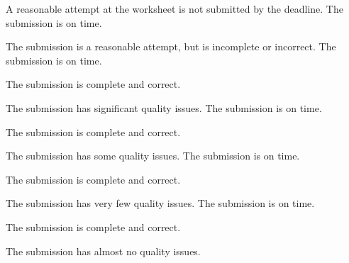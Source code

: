 \documentclass{../fal_assignment}
\begin{document}
\begin{markingrubric}
%
        \grade\fail	A reasonable attempt at the worksheet is not submitted by the deadline.
        \grade 		The submission is on time.
        \par		The submission is a reasonable attempt, but is incomplete or incorrect.
        \grade 		The submission is on time.
        \par 		The submission is complete and correct.
        \par		The submission has significant quality issues.
        \grade 		The submission is on time.
        \par 		The submission is complete and correct.
        \par		The submission has some quality issues.
        \grade 		The submission is on time.
        \par 		The submission is complete and correct.
        \par		The submission has very few quality issues.
        \grade 		The submission is on time.
        \par 		The submission is complete and correct.
        \par		The submission has almost no quality issues.
\end{markingrubric}
\end{document}
